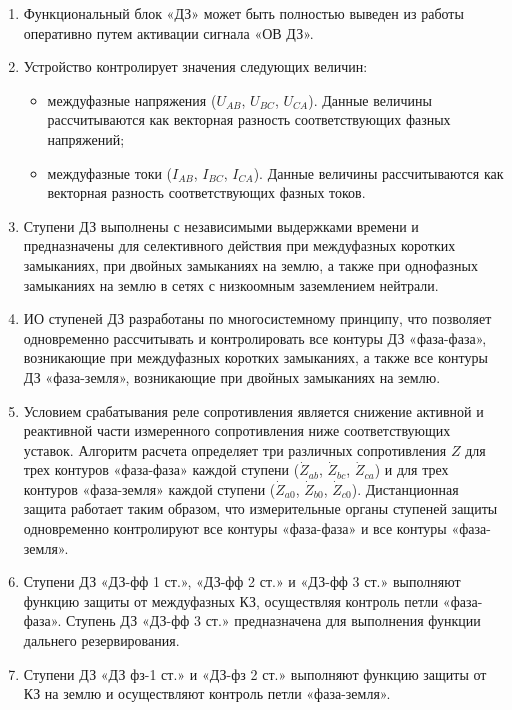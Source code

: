 \begin{enumerate}
\begin{enumerate}
\item
Функциональный блок «ДЗ» может быть полностью выведен из работы оперативно путем активации сигнала «ОВ ДЗ». 

\item 
Устройство контролирует значения следующих величин:
\begin{itemize} 
\item междуфазные  напряжения  ($U_{AB}$,  $U_{BC}$,  $U_{CA}$).  Данные  величины  рассчитываются  как  векторная разность соответствующих фазных напряжений; 
\item междуфазные  токи ($I_{AB}$,  $I_{BC}$,  $I_{CA}$).  Данные  величины  рассчитываются  как  векторная  разность соответствующих фазных токов. 
\end{itemize} 

\item
Ступени  ДЗ  выполнены  с  независимыми  выдержками времени  и  предназначены  для  селективного  действия  при  междуфазных  коротких  замыканиях,  при двойных  замыканиях  на  землю,  а  также  при  однофазных  замыканиях  на  землю  в  сетях  с  низкоомным заземлением нейтрали.

\item
ИО  ступеней  ДЗ  разработаны  по  многосистемному  принципу,  что  позволяет  одновременно рассчитывать и контролировать все контуры ДЗ «фаза-фаза», возникающие при междуфазных коротких замыканиях, а также все контуры ДЗ «фаза-земля», возникающие при двойных замыканиях на землю.

\item
Условием  срабатывания  реле  сопротивления  является  снижение  активной  и  реактивной  части измеренного сопротивления ниже соответствующих уставок. Алгоритм расчета определяет три различных 
сопротивления $Z$ для трех контуров «фаза-фаза» каждой ступени ($\dot Z_{ab}$, $\dot Z_{bc}$, $\dot Z_{ca}$) и для трех контуров «фаза-земля»  каждой  ступени  ($\dot Z_{a0}$,  $\dot Z_{b0}$,  $\dot Z_{c0}$).  Дистанционная  защита  работает  таким  образом,  что измерительные  органы  ступеней  защиты  одновременно  контролируют  все  контуры  «фаза-фаза»  и  все контуры «фаза-земля». 

\item
Ступени ДЗ «ДЗ-фф 1 ст.», «ДЗ-фф 2 ст.» и «ДЗ-фф 3 ст.» выполняют  функцию  защиты  от междуфазных  КЗ,  осуществляя контроль петли «фаза-фаза». Ступень ДЗ «ДЗ-фф 3 ст.»  предназначена  для выполнения функции дальнего резервирования. 

\item
Ступени ДЗ «ДЗ фз-1 ст.»  и  «ДЗ-фз 2 ст.»  выполняют функцию защиты от КЗ на землю и осуществляют контроль петли «фаза-земля». 


\end{enumerate}
\end{enumerate}

